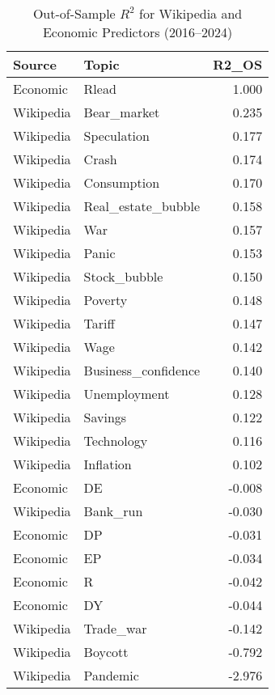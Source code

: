 \begin{table}[ht]
\centering
\begin{tabular}{llr}
  \hline
Source & Topic & R2\_OS \\ 
  \hline
Economic & Rlead & 1.000 \\ 
  Wikipedia & Bear\_market & 0.235 \\ 
  Wikipedia & Speculation & 0.177 \\ 
  Wikipedia & Crash & 0.174 \\ 
  Wikipedia & Consumption & 0.170 \\ 
  Wikipedia & Real\_estate\_bubble & 0.158 \\ 
  Wikipedia & War & 0.157 \\ 
  Wikipedia & Panic & 0.153 \\ 
  Wikipedia & Stock\_bubble & 0.150 \\ 
  Wikipedia & Poverty & 0.148 \\ 
  Wikipedia & Tariff & 0.147 \\ 
  Wikipedia & Wage & 0.142 \\ 
  Wikipedia & Business\_confidence & 0.140 \\ 
  Wikipedia & Unemployment & 0.128 \\ 
  Wikipedia & Savings & 0.122 \\ 
  Wikipedia & Technology & 0.116 \\ 
  Wikipedia & Inflation & 0.102 \\ 
  Economic & DE & -0.008 \\ 
  Wikipedia & Bank\_run & -0.030 \\ 
  Economic & DP & -0.031 \\ 
  Economic & EP & -0.034 \\ 
  Economic & R & -0.042 \\ 
  Economic & DY & -0.044 \\ 
  Wikipedia & Trade\_war & -0.142 \\ 
  Wikipedia & Boycott & -0.792 \\ 
  Wikipedia & Pandemic & -2.976 \\ 
   \hline
\end{tabular}
\caption{Out-of-Sample $R^2$ for Wikipedia and Economic Predictors (2016–2024)} 
\label{tab:table8_combined}
\end{table}
